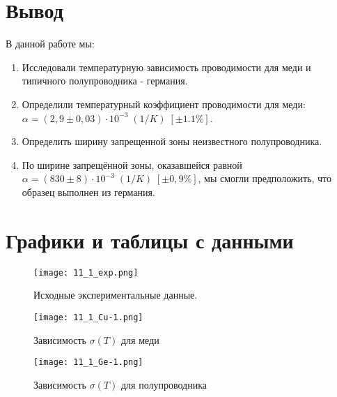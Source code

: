 \documentclass[a4paper]{article}
\begin{document}




\section{Вывод}
В данной работе мы:
\begin{enumerate}
    \item Исследовали температурную зависимость проводимости для меди и типичного полупроводника - германия.
    \item Определили температурный коэффициент проводимости для меди: $\alpha = (2,9 \pm 0,03) \cdot 10^{-3} \; (1/K)\; [\pm 1.1 \%]$.
    \item Определить ширину запрещенной зоны неизвестного полупроводника.
    \item По ширине запрещённой зоны, оказавшейся равной $\alpha = (830 \pm 8) \cdot 10^{-3} \; (1/K)\; [\pm 0,9 \%]$, мы смогли предположить, что образец выполнен из германия.
\end{enumerate}
    

\section{Графики и таблицы с данными}

\begin{figure}[h]
    \begin{center}
        \texttt{[image: 11\_1\_exp.png]}
        \caption{Исходные экспериментальные данные.}
        \label{data2}
    \end{center}
\end{figure}

\begin{figure}[h]
    \begin{center}
        \texttt{[image: 11\_1\_Cu-1.png]}
        \caption{Зависимость $\sigma(T) $ для меди}
        \label{gr5}
    \end{center}
\end{figure}

\begin{figure}[h]
    \begin{center}
        \texttt{[image: 11\_1\_Ge-1.png]}
        \caption{Зависимость $\sigma(T) $ для полупроводника}
        \label{gr3}
    \end{center}
\end{figure}
\end{document}
